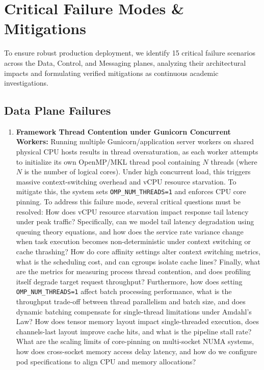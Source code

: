 \documentclass[11pt,a4paper]{article}
\theoremstyle{plain}
\theoremstyle{definition}
\theoremstyle{remark}
\begin{document}
\section{Critical Failure Modes \& Mitigations}\label{sec:failures}
To ensure robust production deployment, we identify 15 critical failure scenarios across the Data, Control, and Messaging planes, analyzing their architectural impacts and formulating verified mitigations as continuous academic investigations.

\subsection{Data Plane Failures}
\begin{enumerate}[label=\textbf{DF\arabic*.}]
    \item \textbf{Framework Thread Contention under Gunicorn Concurrent Workers:} 
    Running multiple Gunicorn/application server workers on shared physical CPU hosts results in thread oversaturation, as each worker attempts to initialize its own OpenMP/MKL thread pool containing $N$ threads (where $N$ is the number of logical cores). Under high concurrent load, this triggers massive context-switching overhead and vCPU resource starvation. 
    To mitigate this, the system sets \texttt{OMP\_NUM\_THREADS=1} and enforces CPU core pinning. 
    To address this failure mode, several critical questions must be resolved: How does vCPU resource starvation impact response tail latency under peak traffic? Specifically, can we model tail latency degradation using queuing theory equations, and how does the service rate variance change when task execution becomes non-deterministic under context switching or cache thrashing? How do core affinity settings alter context switching metrics, what is the scheduling cost, and can cgroups isolate cache lines? Finally, what are the metrics for measuring process thread contention, and does profiling itself degrade target request throughput? Furthermore, how does setting \texttt{OMP\_NUM\_THREADS=1} affect batch processing performance, what is the throughput trade-off between thread parallelism and batch size, and does dynamic batching compensate for single-thread limitations under Amdahl's Law? How does tensor memory layout impact single-threaded execution, does channels-last layout improve cache hits, and what is the pipeline stall rate? What are the scaling limits of core-pinning on multi-socket NUMA systems, how does cross-socket memory access delay latency, and how do we configure pod specifications to align CPU and memory allocations?


\end{enumerate}
\end{document}
